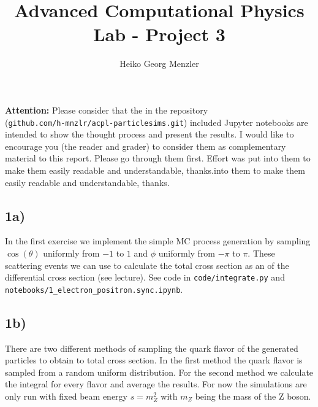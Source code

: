 \documentclass[12pt,a4paper]{scrartcl}
\begin{document}
\title{Advanced Computational Physics Lab - Project 3}
\maketitle

\author{Heiko Georg Menzler}


\vspace{20pt}
\textbf{Attention:}
Please consider that the in the repository\\ (\lstinline{github.com/h-mnzlr/acpl-particlesims.git}) included Jupyter notebooks are intended to show the thought process and present the results.
I would like to encourage you (the reader and grader) to consider them as complementary material to this report. Please go through them first. 
Effort was put into them to make them easily readable and understandable, thanks.into them to make them easily readable and understandable, thanks.

\subsection*{1a)}
In the first exercise we implement the simple MC process generation by sampling $\cos( \theta ) $ uniformly from $-1$ to $1$ and $\phi$ uniformly from $-\pi$ to $\pi$.
These scattering events we can use to calculate the total cross section as an of the differential cross section (see lecture).
See code in \lstinline{code/integrate.py} and \lstinline{notebooks/1_electron_positron.sync.ipynb}.

\subsection*{1b)}

There are two different methods of sampling the quark flavor of the generated particles to obtain to total cross section.  
In the first method the quark flavor is sampled from a random uniform distribution.
For the second method we calculate the integral for every flavor and average the results.
For now the simulations are only run with fixed beam energy $s = m_Z^2$ with $m_Z$ being the mass of the Z boson.
\end{document}
